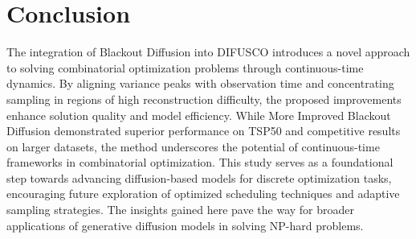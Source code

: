 \section{Conclusion}
The integration of Blackout Diffusion into DIFUSCO introduces a novel approach to solving combinatorial optimization problems through continuous-time dynamics. By aligning variance peaks with observation time and concentrating sampling in regions of high reconstruction difficulty, the proposed improvements enhance solution quality and model efficiency. While More Improved Blackout Diffusion demonstrated superior performance on TSP50 and competitive results on larger datasets, the method underscores the potential of continuous-time frameworks in combinatorial optimization. This study serves as a foundational step towards advancing diffusion-based models for discrete optimization tasks, encouraging future exploration of optimized scheduling techniques and adaptive sampling strategies. The insights gained here pave the way for broader applications of generative diffusion models in solving NP-hard problems.